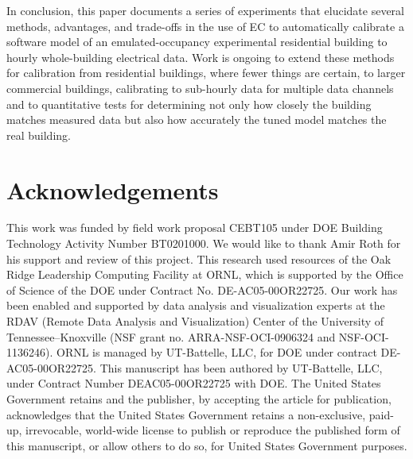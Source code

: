 \documentclass[preprint, review, 12pt]{elsarticle}
\begin{document}
{In conclusion, this paper documents a series of experiments that elucidate several methods, advantages, and trade-offs in the use of EC to automatically calibrate a software model of an emulated-occupancy experimental residential building to hourly whole-building electrical data. Work is ongoing to extend these methods for calibration from %
residential buildings, where fewer things are certain, to larger commercial buildings, calibrating to sub-hourly data for multiple data channels and to quantitative tests for determining not only how closely the building matches measured data but also how accurately the tuned model matches the real building.


\section{Acknowledgements}
This work was funded by field work proposal CEBT105 under DOE Building Technology Activity Number BT0201000. We would like to thank Amir Roth for his support and review of this project. This research used resources of the Oak Ridge Leadership Computing Facility at ORNL, which is supported by the Office of Science of the DOE under Contract No. DE-AC05-00OR22725. Our work has been enabled and supported by data analysis and visualization experts at the RDAV (Remote Data Analysis and Visualization) Center of the University of Tennessee--Knoxville (NSF grant no. ARRA-NSF-OCI-0906324 and NSF-OCI-1136246). ORNL is managed by UT-Battelle, LLC, for DOE under contract DE-AC05-00OR22725. This manuscript has been authored by UT-Battelle, LLC, under Contract Number DEAC05-00OR22725 with DOE. The United States Government retains and the publisher, by accepting the article for publication, acknowledges that the United States Government retains a non-exclusive, paid-up, irrevocable, world-wide license to publish or reproduce the published form of this manuscript, or allow others to do so, for United States Government purposes.





}
\end{document}
